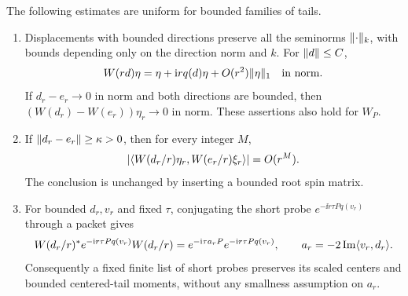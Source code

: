 \begin{samepage}
\begin{lemma}
\label{lem:seed-packet-estimates}
The following estimates are uniform for bounded families of tails.
\begin{enumerate}
\item Displacements with bounded directions preserve all the seminorms
\(\lVert \cdot\rVert_k\), with bounds depending only on the direction norm and
\(k\).  For \(\lVert d\rVert\leq C\),
\[
 W(rd)\eta=\eta+\mathrm i r q(d)\eta+O(r^2)\lVert \eta\rVert_1
 \quad\hbox{in norm}.
\]
If \(d_r-e_r\to0\) in norm and both directions are bounded, then
\((W(d_r)-W(e_r))\eta_r\to0\) in norm.  These assertions also hold
for \(W_P\).
\item If \(\lVert d_r-e_r\rVert\geq\kappa>0\), then for every integer \(M\),
\begin{equation}
\label{eq:seed-packet-separation}
 \lvert \langle W(d_r/r)\eta_r,W(e_r/r)\xi_r\rangle\rvert=O(r^M).
\end{equation}
The conclusion is unchanged by inserting a bounded root spin matrix.
\item For bounded \(d_r,v_r\) and fixed \(\tau\), conjugating the short
probe \(e^{-\ii r\tau Pq(v_r)}\) through a packet gives
\begin{equation}
\label{eq:seed-packet-probe}
 W(d_r/r)^*e^{-\mathrm i r\tau Pq(v_r)}W(d_r/r)
 =e^{-\mathrm i\tau a_rP}e^{-\mathrm i r\tau Pq(v_r)},
 \qquad a_r=-2\operatorname{Im}\langle v_r,d_r\rangle.
\end{equation}
Consequently a fixed finite list of short probes preserves its scaled
centers and bounded centered-tail moments, without any smallness
assumption on \(a_r\).
\end{enumerate}
\end{lemma}
\end{samepage}

